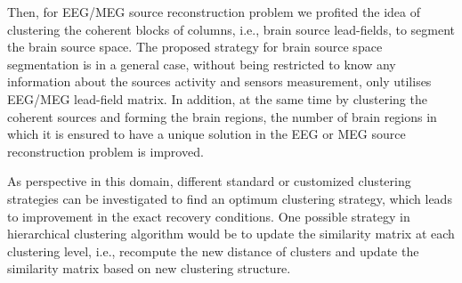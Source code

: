 Then, for EEG/MEG source reconstruction problem we profited the idea of clustering the coherent blocks of columns, i.e., brain source lead-fields, to segment the brain source space.
The proposed strategy for brain source space segmentation is in a general case, without being restricted to know any information about the sources activity and sensors measurement, only utilises EEG/MEG lead-field matrix.
In addition, at the same time by clustering the coherent sources and forming the brain regions, the number of brain regions in which it is ensured to have a unique solution in the EEG or MEG source reconstruction problem is improved.

As perspective in this domain, different standard or customized clustering strategies can be investigated to find an optimum clustering strategy, which leads to improvement in the exact recovery conditions.
One possible strategy in hierarchical clustering algorithm would be to update the similarity matrix at each clustering level, i.e., recompute the new distance of clusters and update the similarity matrix based on new clustering structure.
